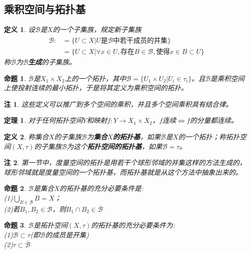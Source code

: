 \documentclass[UTF8]{ctexart}
\newtheorem{dfnt}{定义}
\newtheorem{thr}{定理}
\newtheorem*{note}{注}
\newtheorem{pro}{命题}
\begin{document}
\subsection{乘积空间与拓扑基}
\begin{dfnt}
设$\mathscr{B}$是$X$的一个子集族，规定新子集族
\begin{align*}
 \overline{\mathscr{B}}:&=\{U \subset X | U\mbox{是}\mathscr{B}\mbox{中若干成员的并集}\}\\
& =\{U \subset X| \forall x \in U,\mbox{存在}B \in \mathscr{B},\mbox{使得}x\in B \subset U\}
\end{align*}
称$\overline{\mathscr{B}}$为$\mathscr{B}$\textbf{生成}的子集族。
\end{dfnt}
\begin{pro}
$\overline{\mathscr{B}}$是$X_1 \times X_2$上的一个拓扑，其中$\mathscr{B}=\{U_1 \times U_2|U_i \in \tau_i\}$。且$\overline{\mathscr{B}}$是乘积空间上使投射连续的最小拓扑，于是将其定义为乘积空间的拓扑。
\end{pro}
\begin{note}
这些定义可以推广到多个空间的乘积，并且多个空间乘积具有结合律。
\end{note}
\begin{thr}
对于任何拓扑空间$Y$和映射$f:Y\rightarrow X_1 \times X_2$，$f$连续$\Longleftrightarrow f$的分量都连续。
\end{thr}
\begin{dfnt}
称集合$X$的子集族$\mathscr{B}$为\textbf{集合$X$的拓扑基}，如果$\overline{\mathscr{B}}$是$X$的一个拓扑；称拓扑空间$(X,\tau)$的子集族$\mathscr{B}$为这个\textbf{拓扑空间的拓扑基}，如果$\mathscr{B}=\tau$。
\end{dfnt}
\begin{note}
第一节中，度量空间的拓扑是用若干个球形邻域的并集这样的方法生成的，球形邻域就是度量空间的一个拓扑基，而拓扑基就是从这个方法中抽象出来的。
\end{note}
\begin{pro}
$\mathscr{B}$是集合$X$的拓扑基的充分必要条件是:\\(1)$\displaystyle\bigcup_{B \in \mathscr{B}} B = X$；\\(2)若$B_1,B_2 \in \mathscr{B}$，则$B_1 \cap B_2 \in \overline{\mathscr{B}}$
\end{pro}
\begin{pro}
$\mathscr{B}$是拓扑空间$(X,\tau)$的拓扑基的充分必要条件为:\\(1)$\mathscr{B} \subset \tau$(即$\mathscr{B}$的成员是开集)\\(2)$\tau \subset \overline{\mathscr{B}}$
\end{pro}
\end{document}
